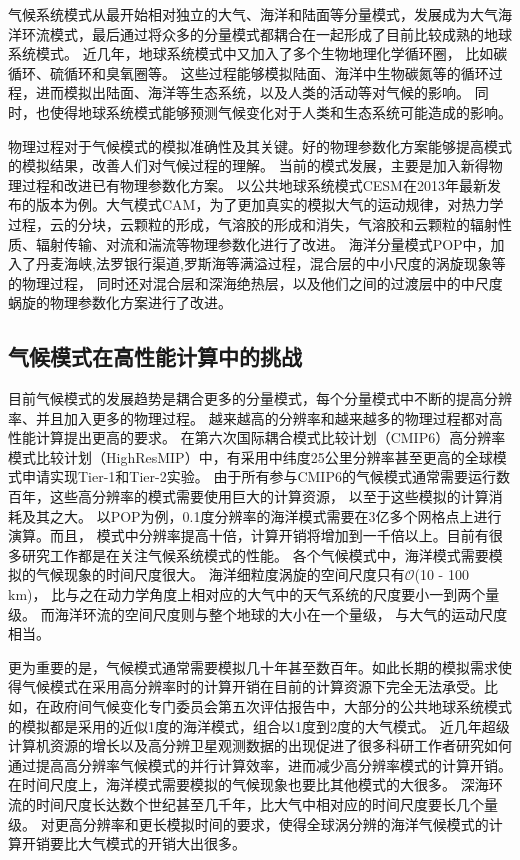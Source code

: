 气候系统模式从最开始相对独立的大气、海洋和陆面等分量模式，发展成为大气海洋环流模式，最后通过将众多的分量模式都耦合在一起形成了目前比较成熟的地球系统模式。
近几年，地球系统模式中又加入了多个生物地理化学循环圈， 比如碳循环、硫循环和臭氧圈等。
这些过程能够模拟陆面、海洋中生物碳氮等的循环过程，进而模拟出陆面、海洋等生态系统，以及人类的活动等对气候的影响。
同时，也使得地球系统模式能够预测气候变化对于人类和生态系统可能造成的影响。



物理过程对于气候模式的模拟准确性及其关键。好的物理参数化方案能够提高模式的模拟结果，改善人们对气候过程的理解。 
当前的模式发展，主要是加入新得物理过程和改进已有物理参数化方案。 
以公共地球系统模式CESM在2013年最新发布的版本\cite{hurrell2013community}为例。大气模式CAM，为了更加真实的模拟大气的运动规律，对热力学过程，云的分块，云颗粒的形成，气溶胶的形成和消失，气溶胶和云颗粒的辐射性质、辐射传输、对流和湍流等物理参数化进行了改进。
海洋分量模式POP中，加入了丹麦海峡,法罗银行渠道,罗斯海等满溢过程，混合层的中小尺度的涡旋现象等的物理过程， 同时还对混合层和深海绝热层，以及他们之间的过渡层中的中尺度蜗旋的物理参数化方案进行了改进。
 

\subsection{气候模式在高性能计算中的挑战}

目前气候模式的发展趋势是耦合更多的分量模式，每个分量模式中不断的提高分辨率、并且加入更多的物理过程\cite{stocker2013ipcc}。
越来越高的分辨率和越来越多的物理过程都对高性能计算提出更高的要求。 
在第六次国际耦合模式比较计划（CMIP6）高分辨率模式比较计划（HighResMIP）中，有采用中纬度25公里分辨率甚至更高的全球模式申请实现Tier-1和Tier-2实验。 
由于所有参与CMIP6的气候模式通常需要运行数百年，这些高分辨率的模式需要使用巨大的计算资源， 以至于这些模拟的计算消耗及其之大。
以POP为例，0.1度分辨率的海洋模式需要在3亿多个网格点上进行演算。而且，
模式中分辨率提高十倍，计算开销将增加到一千倍以上。目前有很多研究工作都是在关注气候系统模式的性能\cite{Worley:2011:PCE:2063384.2063457,dennis2012computational}。 
各个气候模式中，海洋模式需要模拟的气候现象的时间尺度很大。 
海洋细粒度涡旋的空间尺度只有$\mathcal{O}$(10 - 100 km)， 比与之在动力学角度上相对应的大气中的天气系统的尺度要小一到两个量级。
而海洋环流的空间尺度则与整个地球的大小在一个量级， 与大气的运动尺度相当。



更为重要的是，气候模式通常需要模拟几十年甚至数百年。如此长期的模拟需求使得气候模式在采用高分辨率时的计算开销在目前的计算资源下完全无法承受。比如，在政府间气候变化专门委员会第五次评估报告中，大部分的公共地球系统模式的模拟都是采用的近似1度的海洋模式，组合以1度到2度的大气模式。
近几年超级计算机资源的增长以及高分辨卫星观测数据的出现促进了很多科研工作者研究如何通过提高高分辨率气候模式的并行计算效率，进而减少高分辨率模式的计算开销。
在时间尺度上，海洋模式需要模拟的气候现象也要比其他模式的大很多。 深海环流的时间尺度长达数个世纪甚至几千年，比大气中相对应的时间尺度要长几个量级。
对更高分辨率和更长模拟时间的要求，使得全球涡分辨的海洋气候模式的计算开销要比大气模式的开销大出很多\cite{bryan2010frontal,mcclean2011prototype,graham2014importance}。

